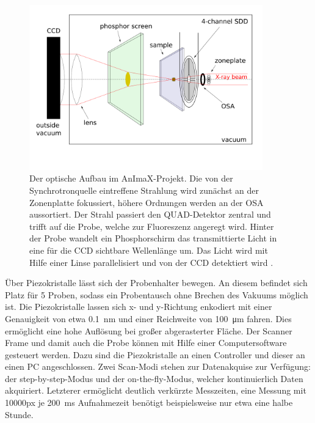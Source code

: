 \begin{figure}[H] %
  \centering
     \includegraphics[width=0.9\textwidth]{illustrations/animax-gruppe_hanna.png}
  \caption[Skizze optischer Aufbau]{Der optische Aufbau im AnImaX-Projekt. Die von der Synchrotronquelle eintreffene Strahlung wird zunächst an der Zonenplatte fokussiert, höhere Ordnungen werden an der OSA aussortiert. Der Strahl passiert den QUAD-Detektor zentral und trifft auf die Probe, welche zur Fluoreszenz angeregt wird. Hinter der Probe wandelt ein Phosphorschirm das transmittierte Licht in eine für die CCD sichtbare Wellenlänge um. Das Licht wird mit Hilfe einer Linse parallelisiert und von der CCD detektiert wird \cite[S.~40]{hanna}.}
  \label{fig:animaxsetup}
\end{figure}
Über Piezokristalle lässt sich der Probenhalter bewegen. An diesem befindet sich Platz für 5 Proben, sodass ein Probentausch ohne Brechen des Vakuums möglich ist. Die Piezokristalle lassen sich x- und y-Richtung enkodiert mit einer Genauigkeit von etwa \SI{0.1}{\nano\meter} und einer Reichweite von \SI{100}{\micro\meter} fahren. Dies ermöglicht eine hohe Auflösung bei großer abgerasterter Fläche. Der Scanner Frame und damit auch die Probe können mit Hilfe einer Computersoftware gesteuert werden. Dazu sind die Piezokristalle an einen Controller und dieser an einen PC angeschlossen. Zwei Scan-Modi stehen zur Datenakquise zur Verfügung: der step-by-step-Modus und der on-the-fly-Modus, welcher kontinuierlich Daten akquiriert. Letzterer ermöglicht deutlich verkürzte Messzeiten, eine Messung mit 10000px je \SI{200}{\milli\second} Aufnahmezeit benötigt beispielsweise nur etwa eine halbe Stunde.\newlines
